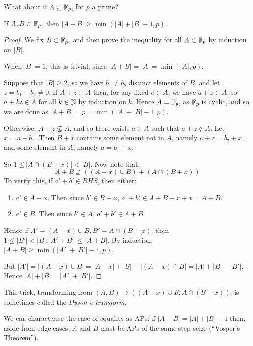 \documentclass[10pt,a4paper]{article}
\begin{document}
What about if $A \subseteq \mathbb{F}_p$, for $p$ a prime?
\begin{lemma}
    If $A, B \subset \mathbb{F}_p$, then $|A+B| \geq \min(|A|+|B|-1,p)$.
\end{lemma}
\begin{proof}
  We fix $B \subset \mathbb{F}_p$, and then prove the inequality for all $A\subset \mathbb{F}_p$ by induction on $|B|$.

  When $|B| = 1$, this is trivial, since $|A+B| = |A| = \min(|A|,p)$.

  Suppose that $|B|\geq 2$, so we have $b_1\neq b_2$ distinct elements of $B$, and let $z = b_1-b_2 \neq 0$. If $A+z\subset A$ then, for any fixed $a \in A$, we have $a+z \in A$, so $a+kz \in A$ for all $k \in \mathbb{N}$ by induction on $k$. Hence $A = \mathbb{F}_p$, as $\mathbb{F}_p$ is cyclic, and so we are done as $|A+B| = p = \min(|A|+|B|-1,p)$.

  Otherwise, $A+z \nsubseteq A$, and so there exists $a \in A$ such that $a+z \notin A$. Let $x = a-b_1$. Then $B+x$ contains some element not in $A$, namely $a+z = b_2+x$, and some element in $A$, namely $a=b_1+x$.

  So $1\leq |A\cap (B+x)| < |B|$. Now note that:
  \[A+B \supseteq ((A-x)\cup B) + (A\cap(B+x))\]
  To verify this, if $a'+b' \in RHS$, then either:
  \begin{enumerate}
    \item $a' \in A-x$. Then since $b' \in B+x$, $a'+b' \in A+B-x+x = A+B$.
    \item $a' \in B$. Then since $b' \in A$, $a'+b' \in A+B$.
  \end{enumerate}
  Hence if $A' = (A-x)\cup B, B' = A\cap(B+x)$, then $1\leq |B'| < |B|, |A'+B'| \leq |A+B|$. By induction, $|A+B| \geq \min(|A'|+|B'|-1,p)$.

  But $|A'| = |(A-x)\cup B| = |A-x| + |B| - |(A-x)\cap B| = |A|+|B|-|B'|$. Hence $|A|+|B| = |A'|+|B'|$.
\end{proof}
This trick, transforming from $(A,B) \to ((A-x)\cup B, A\cap (B+x))$, is sometimes called the \emph{Dyson e-transform}.

We can characterise the case of equality as APs: if $|A+B| = |A|+|B|-1$ then, aside from edge cases, $A$ and $B$ must be APs of the same step seize (``Vosper's Theorem'').
\end{document}
